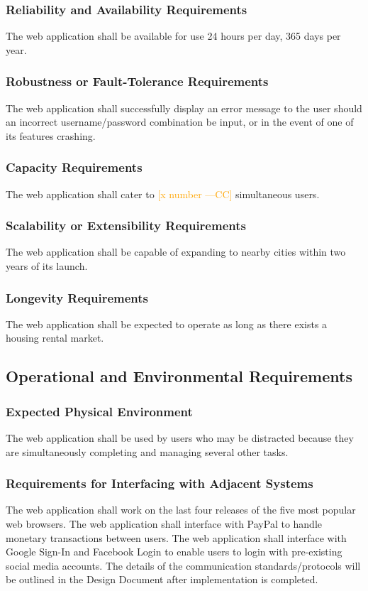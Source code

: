 \documentclass[12pt, titlepage]{article}
\newcommand{\authornote}[3]{\textcolor{#1}{[#3 ---#2]}}
\newcommand{\authornote}[3]{}
\newcommand{\cc}[1]{\authornote{orange}{CC}{#1}}
\begin{document}
{\subsubsection{Reliability and Availability Requirements}
The web application shall be available for use 24 hours per day, 365 days per year.
\subsubsection{Robustness or Fault-Tolerance Requirements}
The web application shall successfully display an error message to the user should an incorrect username/password combination be input, or in the event of one of its features crashing.  
\subsubsection{Capacity Requirements}
The web application shall cater to \cc{x number} simultaneous users. 
\subsubsection{Scalability or Extensibility Requirements}
The web application shall be capable of expanding to nearby cities within two years of its launch.
\subsubsection{Longevity Requirements}
The web application shall be expected to operate as long as there exists a housing rental market.
\subsection{Operational and Environmental Requirements}
\subsubsection{Expected Physical Environment}
The web application shall be used by users who may be distracted because they are simultaneously completing and managing several other tasks. 
\subsubsection{Requirements for Interfacing with Adjacent Systems}
The web application shall work on the last four releases of the five most popular web browsers. The web application shall interface with PayPal to handle monetary transactions between users. The web application shall interface with Google Sign-In and Facebook Login to enable users to login with pre-existing social media accounts. The details of the communication standards/protocols will be outlined in the Design Document after implementation is completed.
}
\end{document}
